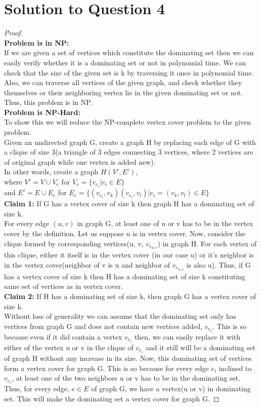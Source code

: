 \documentclass[11pt]{article}
\begin{document}
\section{Solution to Question 4}
\begin{proof}\\
  \textbf{Problem is in NP:} \\
   If we are given a set of vertices which constitute the dominating set then we can easily verify whether it is a dominating set or not in polynomial time. We can check that the size of the given set is k by traversing it once in polynomial time. Also, we can traverse all vertices of the given graph, and check whether they themselves or their neighboring vertex lie in the given dominating set or not.
   Thus, this problem is in NP. \\
  \textbf{Problem is NP-Hard:} \\
   To show this we will reduce the NP-complete vertex cover problem to the given problem. \\
   Given an undirected graph G, create a graph H by replacing each edge of G with a clique of size 3(a triangle of 3 edges connecting 3 vertices, where 2 vertices are of original graph while one vertex is added new).\\ In other words, create a graph $H(V', E')$, \\ where $V' = V \cup V_e$ for $V_e = \{v_{e_i}|e_i \in E\}$ \\
   and $E' = E \cup E_e$ for $E_e = \{(v_{e_i},v_k)(v_{e_i},v_l)|e_i = (v_k, v_l) \in E\}$ \\
   \textbf{Claim 1:} If G has a vertex cover of size k then graph H has a dominating set of size k. \\
   For every edge $(u, v)$ in graph G, at least one of u or v has to be in the vertex cover by the definition. Let us suppose u is in vertex cover. Now, consider the clique formed by corresponding vertices(u, v, $v_{e_{u,v}}$) in graph H. For each vertex of this clique, either it itself is in the vertex cover (in our case u) or it's neighbor is in the vertex cover(neighbor of v is u and neighbor of $v_{e_{u,v}}$ is also u). Thus, if G has a vertex cover of size k then H has a dominating set of size k constituting same set of vertices as in vertex cover.\\  
   \textbf{Claim 2:} If H has a dominating set of size k, then graph G has a vertex cover of size k.\\
   Without loss of generality we can assume that the dominating set only has vertices from graph G and does not contain new vertices added, $v_{e_i}$. This is so because even if it did contain a vertex $v_{e_i}$ then, we can easily replace it with either of the vertex u or v in the clique of $v_{e_i}$ and it still will be a dominating set of graph H without any increase in its size. Now, this dominating set of vertices form a vertex cover for graph G. This is so because for every edge $e_i$ inclined to $v_{e_i}$, at least one of the two neighbors u or v has to be in the dominating set. Thus, for every edge, $e \in E$ of graph G, we have a vertex(u or v) in dominating set. This will make the dominating set a vertex cover for graph G.
   \end{proof}
\end{document}
